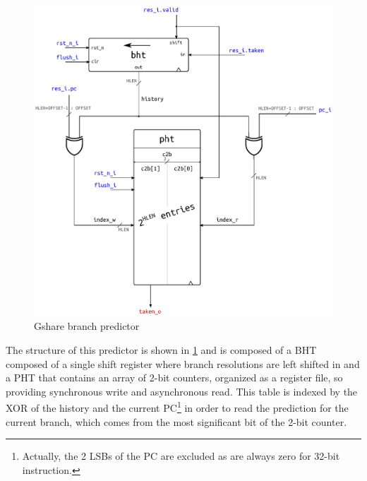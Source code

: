 \begin{figure}[hbt]
  \centering
  \includegraphics[width=\textwidth]{img/gshare.pdf}
  \caption{Gshare branch predictor}
  \label{fig:gshare}
\end{figure}
The structure of this predictor is shown in \cref{fig:gshare} and is composed of a \ac{BHT} composed of a single shift register where branch resolutions are left shifted in and a \ac{PHT} that contains an array of 2-bit counters, organized as a register file, so providing synchronous write and asynchronous read. This table is indexed by the XOR of the history and the current \ac{PC}\footnote{Actually, the 2 LSBs of the \ac{PC} are excluded as are always zero for 32-bit instruction.} in order to read the prediction for the current branch, which comes from the most significant bit of the 2-bit counter.

